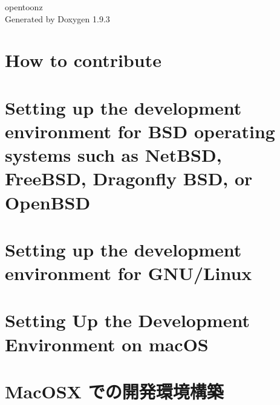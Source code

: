 \documentclass[twoside]{book}
\newcommand{\+}{\discretionary{\mbox{\scriptsize$\hookleftarrow$}}{}{}}
\newcommand{\clearemptydoublepage}{%
    \newpage{\pagestyle{empty}\cleardoublepage}%
  }
\begin{document}
  \raggedbottom
    \hypersetup{pageanchor=false,
                bookmarksnumbered=true,
                pdfencoding=unicode
               }
  \begin{titlepage}
  \vspace*{7cm}
  \begin{center}%
  {\Large opentoonz}\\
  \vspace*{1cm}
  {\large Generated by Doxygen 1.9.3}\\
  \end{center}
  \end{titlepage}
  \clearemptydoublepage
  \tableofcontents
  \clearemptydoublepage
  \hypersetup{pageanchor=true}
\chapter{How to contribute}
\label{md__e__opentoonz__c_o_n_t_r_i_b_u_t_i_n_g}

\chapter{Setting up the development environment for BSD operating systems such as Net\+BSD, Free\+BSD, Dragonfly BSD, or Open\+BSD}
\label{md__e__opentoonz_doc_how_to_build_bsd}

\chapter{Setting up the development environment for GNU/\+Linux}
\label{md__e__opentoonz_doc_how_to_build_linux}

\chapter{Setting Up the Development Environment on mac\+OS}
\label{md__e__opentoonz_doc_how_to_build_macosx}

\chapter{Mac\+OSX での開発環境構築}
\label{md__e__opentoonz_doc_how_to_build_macosx_ja}

\end{document}

